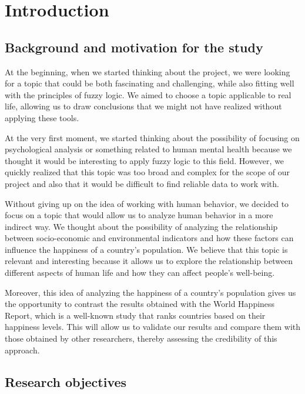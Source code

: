 \documentclass[fleqn,11pt]{article}
\begin{document}


\newpage
\tableofcontents

\newpage

\section{Introduction}

\subsection{Background and motivation for the study}

At the beginning, when we started thinking about the project, we were looking for a topic that could be both fascinating and challenging, while also fitting well with the principles of fuzzy logic. We aimed to choose a topic applicable to real life, allowing us to draw conclusions that we might not have realized without applying these tools.

At the very first moment, we started thinking about the possibility of focusing on psychological analysis or something related to human mental health because we thought it would be interesting to apply fuzzy logic to this field. However, we quickly realized that this topic was too broad and complex for the scope of our project and also that it would be difficult to find reliable data to work with.

Without giving up on the idea of working with human behavior, we decided to focus on a topic that would allow us to analyze human behavior in a more indirect way. We thought about the possibility of analyzing the relationship between socio-economic and environmental indicators and how these factors can influence the happiness of a country's population. We believe that this topic is relevant and interesting because it allows us to explore the relationship between different aspects of human life and how they can affect people's well-being.

Moreover, this idea of analyzing the happiness of a country's population gives us the opportunity to contrast the results obtained with the World Happiness Report, which is a well-known study that ranks countries based on their happiness levels. This will allow us to validate our results and compare them with those obtained by other researchers, thereby assessing the credibility of this approach.
\subsection{Research objectives}
\end{document}
